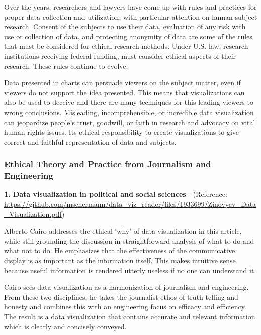 \documentclass[]{book}
\theoremstyle{definition}
\theoremstyle{definition}
\theoremstyle{definition}
\theoremstyle{remark}
\begin{document}
\citep{poli_social_science}

Over the years, researchers and lawyers have come up with rules and
practices for proper data collection and utilization, with particular
attention on human subject research. Consent of the subjects to use
their data, evaluation of any risk with use or collection of data, and
protecting anonymity of data are some of the rules that must be
considered for ethical research methods. Under U.S. law, research
institutions receiving federal funding, must consider ethical aspects of
their research. These rules continue to evolve.

Data presented in charts can persuade viewers on the subject matter,
even if viewers do not support the idea presented. This means that
visualizations can also be used to deceive and there are many techniques
for this leading viewers to wrong conclusions. Misleading,
incomprehensible, or incredible data visualization can jeopardize
people's trust, goodwill, or faith in research and advocacy on vital
human rights issues. Its ethical responsibility to create visualizations
to give correct and faithful representation of data and subjects.

\subsubsection{\texorpdfstring{\textbf{Ethical Theory and Practice from
Journalism and
Engineering}}{Ethical Theory and Practice from Journalism and Engineering}}\label{ethical-theory-and-practice-from-journalism-and-engineering}

\textbf{1. Data visualization in political and social sciences} -
(Reference:
\url{https://github.com/mschermann/data_viz_reader/files/1933699/Zinovyev_Data_Visualization.pdf})
\citep{ethical_infographics}

Alberto Cairo addresses the ethical `why' of data visualization in this
article, while still grounding the discussion in straightforward
analysis of what to do and what not to do. He emphasizes that the
effectiveness of the communicative display is as important as the
information itself. This makes intuitive sense because useful
information is rendered utterly useless if no one can understand it.

Cairo sees data visualization as a harmonization of journalism and
engineering. From these two disciplines, he takes the journalist ethos
of truth-telling and honesty and combines this with an engineering focus
on efficacy and efficiency. The result is a data visualization that
contains accurate and relevant information which is clearly and
concisely conveyed.
\end{document}
